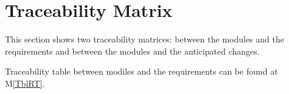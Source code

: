 \documentclass[12pt, titlepage]{article}
\newcommand{\mref}[1]{M\ref{#1}}
\begin{document}



\section{Traceability Matrix} \label{SecTM}

This section shows two traceability matrices: between the modules and the
requirements and between the modules and the anticipated changes.

Traceability table between modiles and the requirements can be found at \mref{TblRT}. \\
\end{document}
